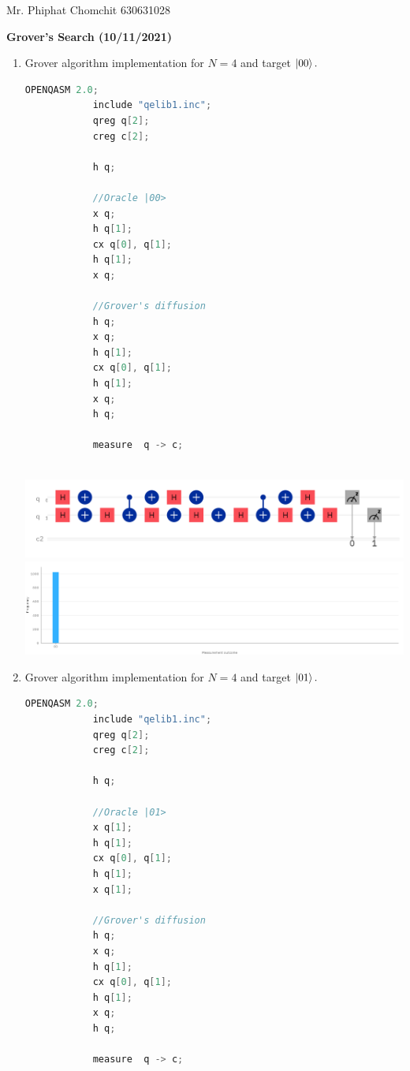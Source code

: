 \documentclass[12pt, a4paper]{article}
\begin{document}
	Mr. Phiphat Chomchit 630631028
	\begin{center}
		\textbf{ Grover’s Search (10/11/2021)}
	\end{center}
	\begin{enumerate}
		\item Grover algorithm implementation for $N = 4$ and target $\ket{00}.$
			\begin{lstlisting}[language=Java, caption= Oracle |00>]
			OPENQASM 2.0;
			include "qelib1.inc";
			qreg q[2];
			creg c[2];
			
			h q;
			
			//Oracle |00>
			x q;
			h q[1];
			cx q[0], q[1];
			h q[1];
			x q;
			
			//Grover's diffusion
			h q;
			x q;
			h q[1];
			cx q[0], q[1];
			h q[1];
			x q;
			h q;
			
			measure  q -> c;
			
		\end{lstlisting}
		
		\includegraphics[scale=0.4]{circuit-00.png}
		\includegraphics[scale=0.2]{bar-00.png}
		
		\item Grover algorithm implementation for $N = 4$ and target $\ket{01}.$
		\begin{lstlisting}[language=Java, caption= Oracle |01>]
			OPENQASM 2.0;
			include "qelib1.inc";
			qreg q[2];
			creg c[2];
			
			h q;
			
			//Oracle |01>
			x q[1];
			h q[1];
			cx q[0], q[1];
			h q[1];
			x q[1];
			
			//Grover's diffusion
			h q;
			x q;
			h q[1];
			cx q[0], q[1];
			h q[1];
			x q;
			h q;
			
			measure  q -> c;
			
		\end{lstlisting}
		

\end{enumerate}
\end{document}
